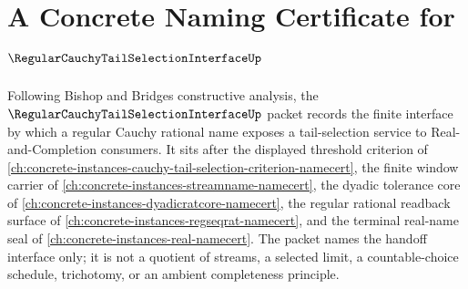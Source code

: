 \chapter{A Concrete Naming Certificate for $\RegularCauchyTailSelectionInterfaceUp$}
\label{ch:concrete-instances-regular-cauchy-tail-selection-interface-namecert}

Following Bishop and Bridges constructive analysis, the $\RegularCauchyTailSelectionInterfaceUp$ packet records the finite interface by which a regular Cauchy rational name exposes a tail-selection service to Real-and-Completion consumers. It sits after the displayed threshold criterion of \autoref{ch:concrete-instances-cauchy-tail-selection-criterion-namecert}, the finite window carrier of \autoref{ch:concrete-instances-streamname-namecert}, the dyadic tolerance core of \autoref{ch:concrete-instances-dyadicratcore-namecert}, the regular rational readback surface of \autoref{ch:concrete-instances-regseqrat-namecert}, and the terminal real-name seal of \autoref{ch:concrete-instances-real-namecert}. The packet names the handoff interface only; it is not a quotient of streams, a selected limit, a countable-choice schedule, trichotomy, or an ambient completeness principle.

